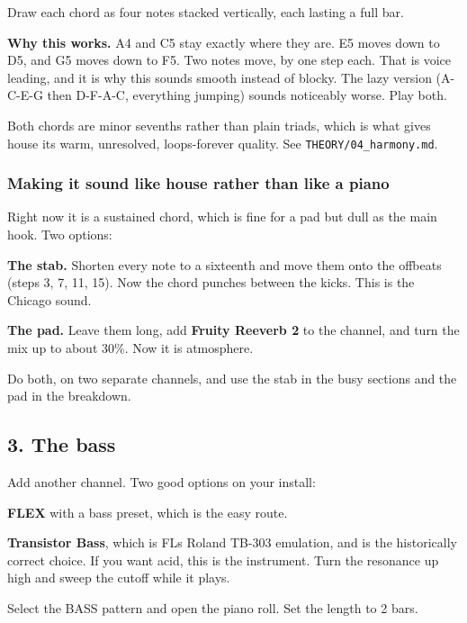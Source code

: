 Draw each chord as four notes stacked vertically, each lasting a full bar.

\begin{intuitionbox}
\textbf{Why this works.} A4 and C5 stay exactly where they are. E5 moves down to D5, and G5 moves
down to F5. Two notes move, by one step each. That is voice leading, and it is why this
sounds smooth instead of blocky. The lazy version (A-C-E-G then D-F-A-C, everything jumping)
sounds noticeably worse. Play both.
\end{intuitionbox}

Both chords are minor sevenths rather than plain triads, which is what gives house its
warm, unresolved, loops-forever quality. See \texttt{THEORY/04\_harmony.md}.

\subsubsection{Making it sound like house rather than like a piano}\label{fl03_first_track-making-it-sound-like-house-rather-than-like-a-piano}

Right now it is a sustained chord, which is fine for a pad but dull as the main hook. Two
options:

\textbf{The stab.} Shorten every note to a sixteenth and move them onto the offbeats (steps 3, 7,
11, 15). Now the chord punches between the kicks. This is the Chicago sound.

\textbf{The pad.} Leave them long, add \textbf{Fruity Reeverb 2} to the channel, and turn the mix up
to about 30\%. Now it is atmosphere.

Do both, on two separate channels, and use the stab in the busy sections and the pad in the
breakdown.

\subsection{3. The bass}\label{fl03_first_track-3-the-bass}

Add another channel. Two good options on your install:

\textbf{FLEX} with a bass preset, which is the easy route.

\textbf{Transistor Bass}, which is FL\textquotesingle s Roland TB-303 emulation, and is the historically correct
choice. If you want acid, this is the instrument. Turn the resonance up high and sweep the
cutoff while it plays.

Select the BASS pattern and open the piano roll. Set the length to 2 bars.


